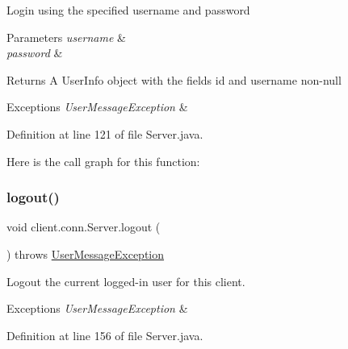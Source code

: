 Login using the specified username and password 
\begin{DoxyParams}{Parameters}
{\em username} & \\
\hline
{\em password} & \\
\hline
\end{DoxyParams}
\begin{DoxyReturn}{Returns}
A {\ttfamily User\+Info} object with the fields {\ttfamily id} and {\ttfamily username} non-\/null 
\end{DoxyReturn}

\begin{DoxyExceptions}{Exceptions}
{\em User\+Message\+Exception} & \\
\hline
\end{DoxyExceptions}


Definition at line 121 of file Server.\+java.

Here is the call graph for this function\+:
\hypertarget{classclient_1_1conn_1_1_server_af45689754d02a83d53602d01a9bf2427}{}\label{classclient_1_1conn_1_1_server_af45689754d02a83d53602d01a9bf2427} 
\subsubsection{\texorpdfstring{logout()}{logout()}}
{\footnotesize\ttfamily void client.\+conn.\+Server.\+logout (\begin{DoxyParamCaption}{ }\end{DoxyParamCaption}) throws \hyperlink{classpt_1_1up_1_1fe_1_1lpro1613_1_1sharedlib_1_1exceptions_1_1_user_message_exception}{User\+Message\+Exception}}

Logout the current logged-\/in user for this client. 
\begin{DoxyExceptions}{Exceptions}
{\em User\+Message\+Exception} & \\
\hline
\end{DoxyExceptions}


Definition at line 156 of file Server.\+java.

\hypertarget{classclient_1_1conn_1_1_server_a945189dab00f6350cb5a444a910c4dd5}{}\label{classclient_1_1conn_1_1_server_a945189dab00f6350cb5a444a910c4dd5} 
